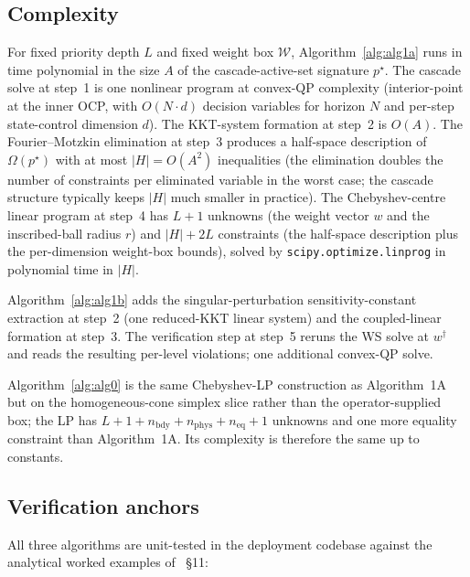 \subsection*{Complexity}

For fixed priority depth $L$ and fixed weight box $\mathcal W$, Algorithm~\ref{alg:alg1a} runs in time polynomial in the size $A$ of the cascade-active-set signature $p^{\star}$. The cascade solve at step~1 is one nonlinear program at convex-QP complexity (interior-point at the inner OCP, with $O(N \cdot d)$ decision variables for horizon $N$ and per-step state-control dimension $d$). The KKT-system formation at step~2 is $O(A)$. The Fourier--Motzkin elimination at step~3 produces a half-space description of $\Omega(p^{\star})$ with at most $|H| = O(A^{2})$ inequalities (the elimination doubles the number of constraints per eliminated variable in the worst case; the cascade structure typically keeps $|H|$ much smaller in practice). The Chebyshev-centre linear program at step~4 has $L + 1$ unknowns (the weight vector $w$ and the inscribed-ball radius $r$) and $|H| + 2L$ constraints (the half-space description plus the per-dimension weight-box bounds), solved by \texttt{scipy.optimize.linprog} in polynomial time in $|H|$.

Algorithm~\ref{alg:alg1b} adds the singular-perturbation sensitivity-constant extraction at step~2 (one reduced-KKT linear system) and the coupled-linear formation at step~3. The verification step at step~5 reruns the WS solve at $w^{\dagger}$ and reads the resulting per-level violations; one additional convex-QP solve.

Algorithm~\ref{alg:alg0} is the same Chebyshev-LP construction as Algorithm~1A but on the homogeneous-cone simplex slice rather than the operator-supplied box; the LP has $L + 1 + n_{\mathrm{bdy}} + n_{\mathrm{phys}} + n_{\mathrm{eq}} + 1$ unknowns and one more equality constraint than Algorithm~1A. Its complexity is therefore the same up to constants.

\subsection*{Verification anchors}

All three algorithms are unit-tested in the deployment codebase against the analytical worked examples of~\cite{lcp2025} \S11:

